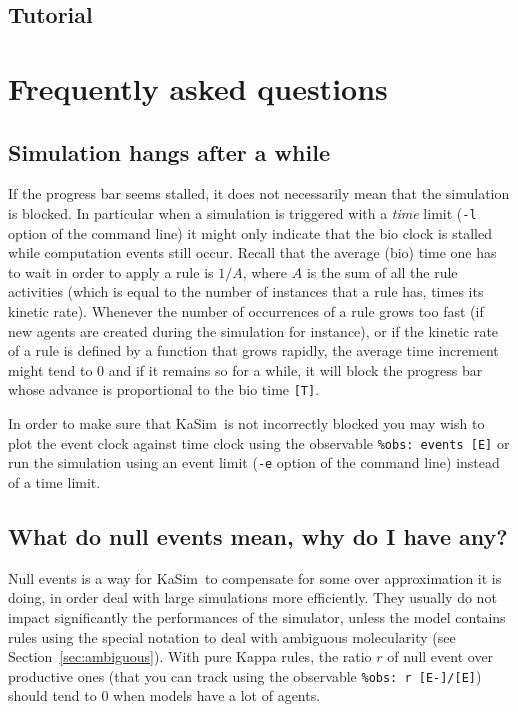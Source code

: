 \documentclass[11pt]{book}
\def\KaSim{\textsf{KaSim}}
\def\ttt#1{\texttt{#1}}
\begin{document}
\section{Tutorial}


\chapter{Frequently asked questions}
\section*{Simulation hangs after a while}
If the progress bar seems stalled, it does not necessarily mean that the simulation is blocked. In particular when a simulation is triggered with a \emph{time} limit (\ttt{-l} option of the command line) it might only indicate that the bio clock is stalled while computation events still occur. Recall that the average (bio) time one has to wait in order to apply a rule is $1/A$, where $A$ is the sum of all the rule activities (which is equal to the number of instances that a rule has, times its kinetic rate). Whenever the number of occurrences of a rule grows too fast (if new agents are created during the simulation for instance), or if the kinetic rate of a rule is defined by a function that grows rapidly, the average time increment might tend to 0 and if it remains so for a while, it will block the progress bar whose advance is proportional to the bio time \ttt{[T]}.

In order to make sure that \KaSim~is not incorrectly blocked you may wish to plot the event clock against time clock using the observable \ttt{\%obs: {\textquotesingle}events{\textquotesingle} [E]} or run the simulation using an event limit (\ttt{-e} option of the command line) instead of a time limit.

\section*{What do null events mean, why do I have any?}

Null events is a way for \KaSim~to compensate for some over approximation it is doing, in order deal with large simulations more efficiently. They usually do not impact significantly the performances of the simulator, unless the model contains rules using the special notation to deal with ambiguous molecularity (see Section~\ref{sec:ambiguous}). With pure Kappa rules, the ratio $r$ of null event over productive ones (that you can track using the observable \ttt{\%obs: {\textquotesingle}r{\textquotesingle}  [E-]/[E]}) should tend to 0 when models have a lot of agents.
\end{document}
